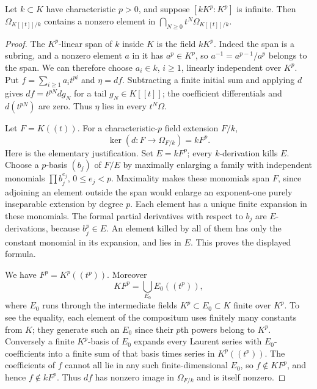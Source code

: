 \begin{lemma}\label{SA23-A-07}
Let $k\subset K$ have characteristic $p>0$, and suppose
$[kK^p:K^p]$ is infinite.  Then $\Omega_{K[[t]]/k}$ contains a
nonzero element in $\bigcap_{N\geq0}t^N\Omega_{K[[t]]/k}$.
\end{lemma}
\begin{proof}
The $K^p$-linear span of $k$ inside $K$ is the field $kK^p$.
Indeed the span is a subring, and a nonzero element $a$ in it has
$a^p\in K^p$, so $a^{-1}=a^{p-1}/a^p$ belongs to the span.
We can therefore choose $a_i\in k$, $i\geq1$, linearly independent
over $K^p$.  Put $f=\sum_{i\geq1}a_it^{pi}$ and $\eta=df$.
Subtracting a finite initial sum and applying $d$ gives
$df=t^{pN}dg_N$ for a tail $g_N\in K[[t]]$; the coefficient
differentials and $d(t^{pN})$ are zero.  Thus $\eta$ lies in every
$t^N\Omega$.

Let $F=K((t))$.  For a characteristic-$p$ field extension $F/k$,
\[
 \ker(d:F\to\Omega_{F/k})=kF^p.
\]
Here is the elementary justification.  Set $E=kF^p$; every
$k$-derivation kills $E$.  Choose a $p$-basis $(b_j)$ of $F/E$ by
maximally enlarging a family with independent monomials
$\prod b_j^{e_j}$, $0\leq e_j<p$.  Maximality makes these monomials
span $F$, since adjoining an element outside the span would enlarge
an exponent-one purely inseparable extension by degree $p$.
Each element has a unique finite expansion in these monomials.
The formal partial derivatives with respect to $b_j$ are
$E$-derivations, because $b_j^p\in E$.  An element killed by all
of them has only the constant monomial in its expansion, and lies
in $E$.  This proves the displayed formula.

We have $F^p=K^p((t^p))$.  Moreover
\[
 KF^p=\bigcup_{E_0} E_0((t^p)),
\]
where $E_0$ runs through the intermediate fields
$K^p\subset E_0\subset K$ finite over $K^p$.  To see the equality,
each element of the compositum uses finitely many constants from
$K$; they generate such an $E_0$ since their $p$th powers belong to
$K^p$.  Conversely a finite $K^p$-basis of $E_0$ expands every
Laurent series with $E_0$-coefficients into a finite sum of that
basis times series in $K^p((t^p))$.
The coefficients of $f$ cannot all lie in any such finite-dimensional
$E_0$, so $f\notin KF^p$, and hence $f\notin kF^p$.
Thus $df$ has nonzero image in $\Omega_{F/k}$ and is itself nonzero.
\end{proof}

